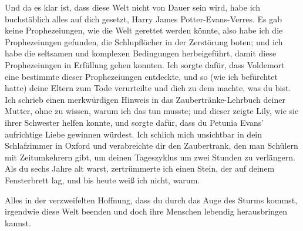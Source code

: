 \begin{writtenNote}
Und da es klar ist, dass diese Welt nicht von Dauer sein wird, habe ich buchstäblich alles auf dich gesetzt, Harry James Potter-Evans-Verres. Es gab keine Prophezeiungen, wie die Welt gerettet werden könnte, also habe ich die Prophezeiungen gefunden, die Schlupflöcher in der Zerstörung boten; und ich habe die seltsamen und komplexen Bedingungen herbeigeführt, damit diese Prophezeiungen in Erfüllung gehen konnten. Ich sorgte dafür, dass Voldemort eine bestimmte dieser Prophezeiungen entdeckte, und so (wie ich befürchtet hatte) deine Eltern zum Tode verurteilte und dich zu dem machte, was du bist. Ich schrieb einen merkwürdigen Hinweis in das Zaubertränke-Lehrbuch deiner Mutter, ohne zu wissen, warum ich das tun musste; und dieser zeigte Lily, wie sie ihrer Schwester helfen konnte, und sorgte dafür, dass du Petunia Evans’ aufrichtige Liebe gewinnen würdest. Ich schlich mich unsichtbar in dein Schlafzimmer in Oxford und verabreichte dir den Zaubertrank, den man Schülern mit Zeitumkehrern gibt, um deinen Tageszyklus um zwei Stunden zu verlängern. Als du sechs Jahre alt warst, zertrümmerte ich einen Stein, der auf deinem Fensterbrett lag, und bis heute weiß ich nicht, warum.

Alles in der verzweifelten Hoffnung, dass du durch das Auge des Sturms kommst, irgendwie diese Welt beenden und doch ihre Menschen lebendig herausbringen kannst.


\end{writtenNote}
